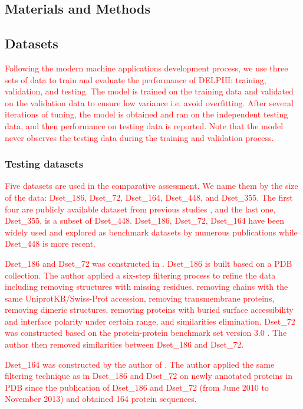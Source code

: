 \documentclass{bioinfo}
\newcommand{\myColor}{red}
\begin{document}
\begin{methods}
\section{Materials and Methods}
\subsection{Datasets}
\textcolor{\myColor}{Following the modern machine applications development process, we use three sets of data to train and evaluate the performance of DELPHI: training, validation, and testing. The model is trained on the training data and validated on the validation data to ensure low variance i.e. avoid overfitting. After several iterations of tuning, the model is obtained and ran on the independent testing data, and then performance on testing data is reported. Note that the model never observes the testing data during the training and validation process.}

\subsubsection{Testing datasets}\label{testing_data}
\textcolor{\myColor}{Five datasets are used in the comparative assessment. We name them by the size of the data: Dset\_186, Dset\_72, Dset\_164, Dset\_448, and Dset\_355. The first four are publicly available dataset from previous studies \citep{murakami2010applying} \citep{dhole2014sequence} \citep{zhang2019scriber}, and the last one, Dset\_355, is a subset of Dset\_448. Dset\_186, Dset\_72, Dset\_164 have been widely used and explored as benchmark datasets by numerous publications while Dset\_448 is more recent.} 

\textcolor{\myColor}{
Dset\_186 and Dset\_72 was constructed in \citep{murakami2010applying}. Dset\_186 is built based on a PDB \citep{berman2002protein} collection. The author applied a six-step filtering process to refine the data including removing structures with missing residues, removing chains with the same UniprotKB/Swiss-Prot accession, removing transmembrane proteins, removing dimeric structures, removing proteins with buried surface accessibility and interface polarity under certain range, and similarities elimination. Dset\_72 was constructed based on the protein-protein benchmark set version 3.0 \citep{hwang2008protein}. The author then removed similarities between Dset\_186 and Dset\_72.
}

\textcolor{\myColor}{
Dset\_164 was constructed by the author of \citep{dhole2014sequence}. The author applied the same filtering technique as in Dset\_186 and Dset\_72 on newly annotated proteins in PDB since the publication of Dset\_186 and Dset\_72 (from June 2010 to November 2013) and obtained 164 protein sequences. 
}


\end{methods}
\end{document}
